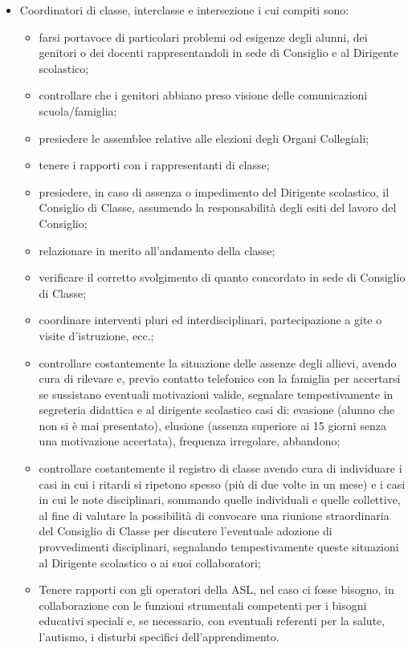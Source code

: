 \documentclass[12pt,a4paper,oneside]{memoir}
\begin{document}
\begin{itemize}
\item Coordinatori di classe, interclasse e intersezione i cui compiti sono: 
\begin{itemize}
\item farsi portavoce di particolari problemi od esigenze degli alunni, dei genitori o dei docenti rappresentandoli in sede di Consiglio e al Dirigente scolastico;
\item controllare che i genitori abbiano preso visione delle comunicazioni scuola/famiglia;
\item presiedere le assemblee relative alle elezioni degli Organi Collegiali;
\item tenere i rapporti con i rappresentanti di classe;
\item presiedere, in caso di assenza o impedimento del Dirigente scolastico, il Consiglio di Classe, assumendo la responsabilità degli esiti del lavoro del Consiglio;
\item relazionare in merito all’andamento della classe;
\item verificare il corretto svolgimento di quanto concordato in sede di Consiglio di Classe;
\item coordinare interventi pluri ed interdisciplinari, partecipazione a gite o visite d’istruzione, ecc.;
\item controllare costantemente la situazione delle assenze degli allievi, avendo cura di rilevare e, previo contatto telefonico con la famiglia per accertarsi se sussistano eventuali motivazioni valide, segnalare tempestivamente in segreteria didattica e al dirigente scolastico casi di: evasione (alunno che non si è mai presentato), elusione (assenza superiore ai 15 giorni senza una motivazione accertata), frequenza irregolare, abbandono;
\item controllare costantemente il registro di classe avendo cura di individuare i casi in cui i ritardi si ripetono spesso (più di due volte in un mese) e i casi in cui le note disciplinari, sommando quelle individuali e quelle collettive, al fine di valutare la possibilità di convocare una riunione straordinaria del Consiglio di Classe per discutere l’eventuale adozione di provvedimenti disciplinari, segnalando tempestivamente queste situazioni al Dirigente scolastico o ai suoi collaboratori;
\item Tenere rapporti con gli operatori della ASL, nel caso ci fosse bisogno, in collaborazione con le funzioni strumentali competenti per i bisogni educativi speciali e, se necessario, con eventuali referenti per la salute, l’autismo, i disturbi specifici dell’apprendimento.

\end{itemize}
\end{itemize}
\end{document}
